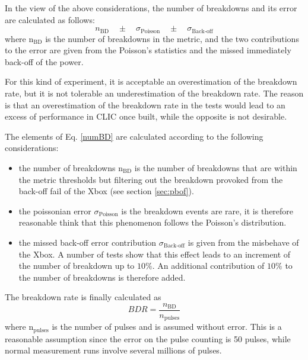 In the view of the above considerations, the number of breakdowns and its error are calculated as follows:
\begin{equation}
n_{\text{BD}} \quad \pm \quad \sigma_{\text{Poisson}} \quad \pm \quad \sigma_{\text{Back-off}} 
\label{numBD}
\end{equation}
where  n$_{\text{BD}}$ is the number of breakdowns in the metric, and the two contributions to the error are given from the Poisson's statistics and the missed immediately back-off of the power. 

For this kind of experiment, it is acceptable an overestimation of the breakdown rate, but it is not tolerable an underestimation of the breakdown rate. The reason is that an overestimation of the breakdown rate in the tests would lead to an excess of performance in CLIC once built, while the opposite is not desirable.   

The elements of Eq. \ref{numBD} are calculated according to the following considerations:
\begin{itemize}
\item the number of breakdowns n$_{\text{BD}}$ is the number of breakdowns that are within the metric thresholds but filtering out the breakdown provoked from the back-off fail of the Xbox (see section \ref{sec:pbof}).  
\item the poissonian error $\sigma_{\text{Poisson}}$ is the breakdown events are rare, it is therefore reasonable think that this phenomenon follows the Poisson's distribution.
\item the missed back-off error contribution $ \sigma_{\text{Back-off}}$ is given from the misbehave of the Xbox. A number of tests show that this effect leads to an increment of the number of breakdown up to $10\%$. An additional contribution of $10\%$ to the number of breakdowns is therefore added.
\end{itemize}

\noindent
The breakdown rate is finally calculated as
\begin{equation}
BDR = \frac{n_{\text{BD}}}{n_{\text{pulses}}}
\end{equation}
where n$_{\text{pulses}}$ is the number of pulses and is assumed without error. This is a reasonable assumption since the error on the pulse counting is 50 pulses, while normal measurement runs involve several millions of pulses.